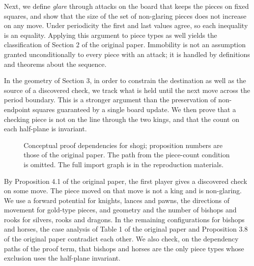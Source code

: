 \documentclass[a4paper,11pt]{article}
\theoremstyle{definition}
\begin{document}
Next, we define \emph{glare} through attacks on the board that keeps the pieces on fixed squares, and show that the size of the set of non-glaring pieces does not increase on any move.
Under periodicity the first and last values agree, so each inequality is an equality.
Applying this argument to piece types as well yields the classification of Section 2 of the original paper.
Immobility is not an assumption granted unconditionally to every piece with an attack; it is handled by definitions and theorems about the sequence.

In the geometry of Section 3, in order to constrain the destination as well as the source of a discovered check, we track what is held until the next move across the period boundary.
This is a stronger argument than the preservation of non-endpoint squares guaranteed by a single board update.
We then prove that a checking piece is not on the line through the two kings, and that the count on each half-plane is invariant.

\begin{figure}[ht]
\centering
{}
\caption{Conceptual proof dependencies for shogi; proposition numbers are those of the original paper. The path from the piece-count condition is omitted. The full import graph is in the reproduction materials.}\label{fig:proof}
\end{figure}

By Proposition 4.1 of the original paper, the first player gives a discovered check on some move.
The piece moved on that move is not a king and is non-glaring.
We use a forward potential for knights, lances and pawns, the directions of movement for gold-type pieces, and geometry and the number of bishops and rooks for silvers, rooks and dragons.
In the remaining configurations for bishops and horses, the case analysis of Table 1 of the original paper and Proposition 3.8 of the original paper contradict each other.
We also check, on the dependency paths of the proof term, that bishops and horses are the only piece types whose exclusion uses the half-plane invariant.
\end{document}
